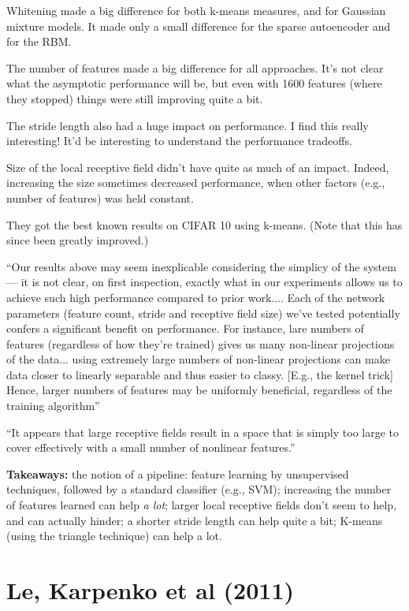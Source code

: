\documentclass[12pt]{report}
\begin{document}
Whitening made a big difference for both k-means measures, and for
Gaussian mixture models.  It made only a small difference for the
sparse autoencoder and for the RBM.

The number of features made a big difference for all approaches.  It's
not clear what the asymptotic performance will be, but even with 1600
features (where they stopped) things were still improving quite a bit.

The stride length also had a huge impact on performance.  I find this
really interesting!  It'd be interesting to understand the performance
tradeoffs.

Size of the local receptive field didn't have quite as much of an
impact.  Indeed, increasing the size sometimes decreased performance,
when other factors (e.g., number of features) was held constant.  

They got the best known results on CIFAR 10 using k-means.  (Note that
this has since been greatly improved.)

``Our results above may seem inexplicable considering the simplicy of
the system --- it is not clear, on first inspection, exactly what in
our experiments allows us to achieve such high performance compared to
prior work.... Each of the network parameters (feature count, stride
and receptive field size) we've tested potentially confers a
significant benefit on performance.  For instance, lare numbers of
features (regardless of how they're trained) gives us many non-linear
projections of the data... using extremely large numbers of non-linear
projections can make data closer to linearly separable and thus easier
to classy.  [E.g., the kernel trick] Hence, larger numbers of features
may be uniformly beneficial, regardless of the training algorithm''

``It appears that large receptive fields result in a space that is
simply too large to cover effectively with a small number of nonlinear
features.''

\textbf{Takeaways:} the notion of a pipeline: feature learning by
unsupervised techniques, followed by a standard classifier (e.g.,
SVM); increasing the number of features learned can help \emph{a lot};
larger local receptive fields don't seem to help, and can actually
hinder; a shorter stride length can help quite a bit; K-means (using
the triangle technique) can help a lot.
 
\section{Le, Karpenko et al (2011)}
\end{document}
